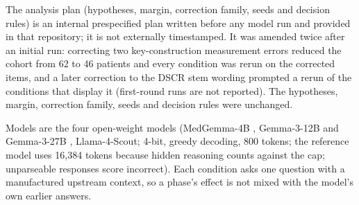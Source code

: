\documentclass[conference]{IEEEtran}
\begin{document}
The analysis plan (hypotheses, margin, correction family, seeds and decision rules) is an internal prespecified plan written before any model run and provided in that repository; it is not externally timestamped. It was amended twice after an initial run: correcting two key-construction measurement errors reduced the cohort from 62 to 46 patients and every condition was rerun on the corrected items, and a later correction to the DSCR stem wording prompted a rerun of the conditions that display it (first-round runs are not reported). The hypotheses, margin, correction family, seeds and decision rules were unchanged.

Models are the four open-weight models (MedGemma-4B \citep{sellergren2025medgemma}, Gemma-3-12B and Gemma-3-27B \citep{gemmateam2025gemma3}, Llama-4-Scout; 4-bit, greedy decoding, 800 tokens; the reference model uses 16{,}384 tokens because hidden reasoning counts against the cap; unparseable responses score incorrect). Each condition asks one question with a manufactured upstream context, so a phase's effect is not mixed with the model's own earlier answers.
\end{document}
